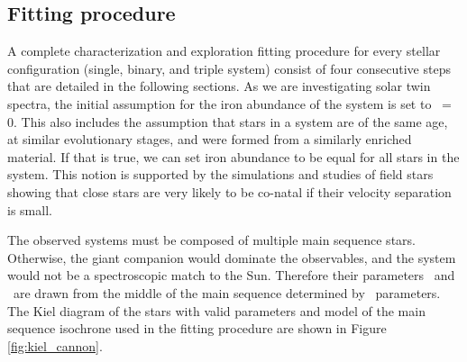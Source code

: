 \subsection{Fitting procedure}
A complete characterization and exploration fitting procedure for every stellar configuration (single, binary, and triple system) consist of four consecutive steps that are detailed in the following sections. As we are investigating solar twin spectra, the initial assumption for the iron abundance of the system is set to \Feh~=~$0$. This also includes the assumption that stars in a system are of the same age, at similar evolutionary stages, and were formed from a similarly enriched material. If that is true, we can set iron abundance to be equal for all stars in the system. This notion is supported by the simulations \cite{2019arXiv190210719K} and studies \cite{2019arXiv190402159K} of field stars showing that close stars are very likely to be co-natal if their velocity separation is small.

The observed systems must be composed of multiple main sequence stars. Otherwise, the giant companion would dominate the observables, and the system would not be a spectroscopic match to the Sun. Therefore their parameters \Teff\ and \Logg\ are drawn from the middle of the main sequence determined by \TC\ parameters. The Kiel diagram of the stars with valid parameters and model of the main sequence isochrone used in the fitting procedure are shown in Figure \ref{fig:kiel_cannon}.

